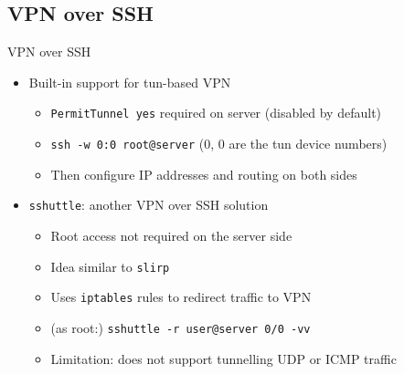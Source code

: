 \documentclass[11pt,final,usepdftitle=false]{beamer}
\begin{document}
\subsection{VPN over SSH}
\begin{frame}{VPN over SSH}
	\begin{itemize}
		\item Built-in support for tun-based VPN
			\hhbr
			\begin{itemize}
				\item \texttt{PermitTunnel yes} required on server (disabled by default)
					\hbr
				\item \texttt{ssh -w 0:0 root@server} (0, 0 are the tun device numbers)
					\hbr
				\item Then configure IP addresses and routing on both sides
			\end{itemize}
			\br
		\item \texttt{sshuttle}: another VPN over SSH solution
			\hhbr
			\begin{itemize}
				\item Root access not required on the server side
					\hbr
				\item Idea similar to \texttt{slirp}
					\hbr
				\item Uses \texttt{iptables} rules to redirect traffic to VPN
					\hbr
				\item (as root:) \texttt{sshuttle -r user@server 0/0 -vv}
					\hbr
				\item Limitation: does not support tunnelling UDP or ICMP traffic
			\end{itemize}
	\end{itemize}
\end{frame}
\end{document}

